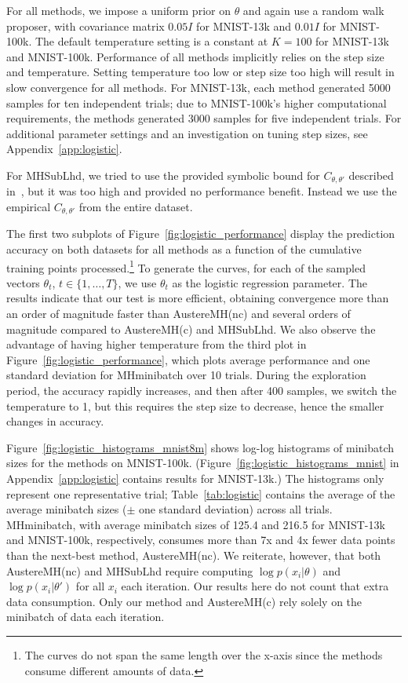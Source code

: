 \documentclass[letterpaper]{article}
\begin{document}
For all methods, we impose a uniform prior on $\theta$ and again use a random
walk proposer, with covariance matrix $0.05I$ for MNIST-13k and $0.01I$ for
MNIST-100k. The default temperature setting is a constant at $K=100$ for
MNIST-13k and MNIST-100k. Performance of all methods implicitly relies on the
step size and temperature. Setting temperature too low or step size too high
will result in slow convergence for all methods. For MNIST-13k, each method
generated 5000 samples for ten independent trials; due to MNIST-100k's higher
computational requirements, the methods generated 3000 samples for five
independent trials.  For additional parameter settings and an investigation on
tuning step sizes, see Appendix~\ref{app:logistic}.

For {\sc MHSubLhd}, we tried to use the provided symbolic bound for
$C_{\theta,\theta'}$ described in~\citep{icml2014c1_bardenet14}, but it was too
high and provided no performance benefit. Instead we use the empirical
$C_{\theta,\theta'}$ from the entire dataset. 

The first two subplots of Figure~\ref{fig:logistic_performance} display the
prediction accuracy on both datasets for all methods as a function of the
cumulative training points processed.\footnote{The curves do not span the same
length over the x-axis since the methods consume different amounts of data.} To
generate the curves, for each of the sampled vectors $\theta_t$,
$t\in\{1,\ldots,T\}$, we use $\theta_t$ as the logistic regression parameter.
The results indicate that our test is more efficient, obtaining convergence more
than an order of magnitude faster than {\sc AustereMH(nc)} and several orders of
magnitude compared to {\sc AustereMH(c)} and {\sc MHSubLhd}.  We also observe
the advantage of having higher temperature from the third plot in
Figure~\ref{fig:logistic_performance}, which plots average performance and one
standard deviation for {\sc MHminibatch} over 10 trials. During the exploration
period, the accuracy rapidly increases, and then after 400 samples, we switch
the temperature to 1, but this requires the step size to decrease, hence the
smaller changes in accuracy.

Figure~\ref{fig:logistic_histograms_mnist8m} shows log-log histograms of
minibatch sizes for the methods on MNIST-100k.
(Figure~\ref{fig:logistic_histograms_mnist} in Appendix~\ref{app:logistic}
contains results for MNIST-13k.) The histograms only represent one
representative trial; Table~\ref{tab:logistic} contains the average of the
average minibatch sizes ($\pm$ one standard deviation) across all trials. {\sc
MHminibatch}, with average minibatch sizes of 125.4 and 216.5 for MNIST-13k and
MNIST-100k, respectively, consumes more than 7x and 4x fewer data points than
the next-best method, {\sc AustereMH(nc)}.  We reiterate, however, that both
{\sc AustereMH(nc)} and {\sc MHSubLhd} require computing $\log p(x_i|\theta)$
and $\log p(x_i|\theta')$ for all $x_i$ each iteration. Our results here do not
count that extra data consumption. Only our method and {\sc AustereMH(c)} rely
solely on the minibatch of data each iteration.
\end{document}
